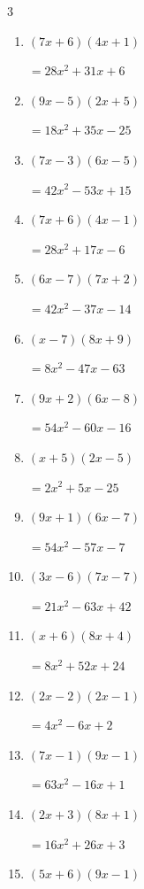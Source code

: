 \begin{multicols}{3}
\begin{enumerate}
        $=8x^{2}+29x+15$

\columnbreak %

  \item $(7x+6)(4x+1)$

        $=28x^{2}+31x+6$

  \item $(9x-5)(2x+5)$

        $=18x^{2}+35x-25$

  \item $(7x-3)(6x-5)$

        $=42x^{2}-53x+15$

  \item $(7x+6)(4x-1)$

        $=28x^{2}+17x-6$

  \item $(6x-7)(7x+2)$

        $=42x^{2}-37x-14$

  \item $(x-7)(8x+9)$

        $=8x^{2}-47x-63$

  \item $(9x+2)(6x-8)$

        $=54x^{2}-60x-16$

  \item $(x+5)(2x-5)$

        $=2x^{2}+5x-25$

  \item $(9x+1)(6x-7)$

        $=54x^{2}-57x-7$

  \item $(3x-6)(7x-7)$

        $=21x^{2}-63x+42$

  \item $(x+6)(8x+4)$

        $=8x^{2}+52x+24$

  \item $(2x-2)(2x-1)$

        $=4x^{2}-6x+2$

  \item $(7x-1)(9x-1)$

        $=63x^{2}-16x+1$

  \item $(2x+3)(8x+1)$

        $=16x^{2}+26x+3$

  \item $(5x+6)(9x-1)$


\end{enumerate}
\end{multicols}
